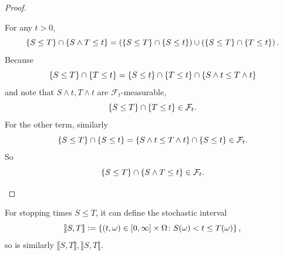 \begin{proof}
\begin{enumerate}[label=(\arabic{*})]
        \noindent For any $t > 0$,
        \begin{equation*}
            \left\{S \leq T\right\} \cap \left\{S \wedge T \leq t\right\} = \left(\left\{S \leq T\right\} \cap\left\{S \leq t\right\}\right) \cup \left(\left\{S \leq T\right\} \cap\left\{T \leq t\right\}\right).
        \end{equation*}
        Because
        \begin{equation*}
            \left\{S \leq T\right\} \cap \left\{T \leq t\right\} = \left\{S \leq t\right\} \cap \left\{T \leq t\right\} \cap \left\{S \wedge t \leq T \wedge t\right\} 
        \end{equation*}
        and note that $S \wedge t,T \wedge t$ are $\mathcal{F}_t$-measurable,
        \begin{equation*}
            \left\{S \leq T\right\} \cap \left\{T \leq t\right\} \in \mathcal{F}_t.
        \end{equation*}
        For the other term, similarly
        \begin{equation*}
            \left\{S \leq T\right\} \cap \left\{S \leq t\right\} = \left\{S \wedge t \leq T \wedge t\right\}  \cap \left\{S \leq t\right\} \in \mathcal{F}_t.
        \end{equation*}
        So
        \begin{equation*}
            \left\{S \leq T\right\} \cap \left\{S \wedge T \leq t\right\} \in \mathcal{F}_t. \qedhere
        \end{equation*}
    \end{enumerate}
\end{proof}
\begin{rmk}
    For stopping times $S \leq T$, it can define the stochastic interval
    \begin{equation*}
        \rrbracket S,T\rrbracket \vcentcolon= \left\{(t,\omega) \in [0,\infty] \times \Omega \colon S(\omega) < t \leq T(\omega)\right\},
    \end{equation*}
    so is similarly $\llbracket S,T \rrbracket,\rrbracket S,T \llbracket$.
\end{rmk}


